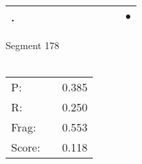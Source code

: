 \documentclass[landscape]{article}
\newcommand{\ssp}{\hspace{2pt}}
\newcommand{\mex}{\cellcolor{g}$\bullet$}
\begin{document}
\begin{tabular}{|l|p{10pt}|p{10pt}|p{10pt}|p{10pt}|p{10pt}|p{10pt}|p{10pt}|p{10pt}|p{10pt}|p{10pt}|}
\hline
\ssp \cellcolor{ref9}. \ssp&\hspace{2pt}&\hspace{2pt}&\hspace{2pt}&\hspace{2pt}&\hspace{2pt}&\hspace{2pt}&\hspace{2pt}&\hspace{2pt}&\hspace{2pt}&\hspace{2pt}\mex\\
\hline
\end{tabular}

\vspace{6pt}
\noindent Segment 178\\\\
\noindent\begin{tabular}{lm{12pt}r}
\hline
P:&&0.385\\
R:&&0.250\\
Frag:&&0.553\\
Score:&&0.118\\
\end{tabular}

\newpage
\end{document}
